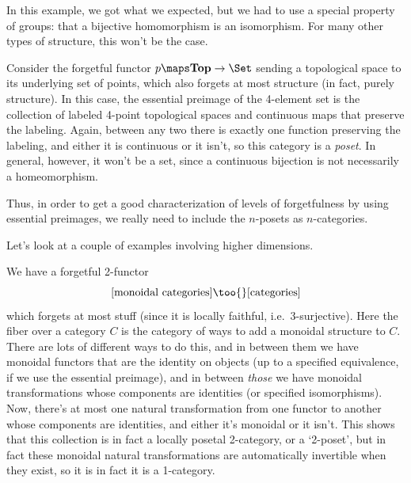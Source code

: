 \documentclass{amsart}
\begin{document}
In this example, we got what we expected, but we had to use a
special property of groups: that a bijective homomorphism is an
isomorphism.  For many other types of structure, this won't be the
case.

\begin{eg}
  Consider the forgetful functor $p\maps \mathbf{Top}\to\Set$ sending
  a topological space to its underlying set of points, which also
  forgets at most structure (in fact, purely structure).  In this
  case, the essential preimage of the 4-element set is the collection
  of labeled 4-point topological spaces and continuous maps that
  preserve the labeling.  Again, between any two there is exactly one
  function preserving the labeling, and either it is continuous or it
  isn't, so this category is a \emph{poset}.  In general, however, it
  won't be a set, since a continuous bijection is not necessarily a
  homeomorphism.
\end{eg}

Thus, in order to get a good characterization of levels of
forgetfulness by using essential preimages, we really need to include
the $n$-posets as $n$-categories.

Let's look at a couple of examples involving higher dimensions.

\begin{eg}
  We have a forgetful 2-functor
  \[[\text{monoidal categories}]\too{} [\text{categories}]\]
  which forgets at most stuff (since it is locally faithful, i.e.\
  3-surjective).  Here the fiber over a category $C$ is the
  category of ways to add a monoidal structure to $C$.  There are
  lots of different ways to do this, and in between them we have
  monoidal functors that are the identity on objects (up to a
  specified equivalence, if we use the essential preimage), and in
  between \emph{those} we have monoidal transformations whose
  components are identities (or specified isomorphisms).  Now, there's
  at most one natural transformation from one functor to another whose
  components are identities, and either it's monoidal or it isn't.
  This shows that this collection is in fact a locally posetal
  2-category, or a `2-poset', but in fact these monoidal natural
  transformations are automatically invertible when they exist, so it
  is in fact it is a 1-category.
\end{eg}
\end{document}
